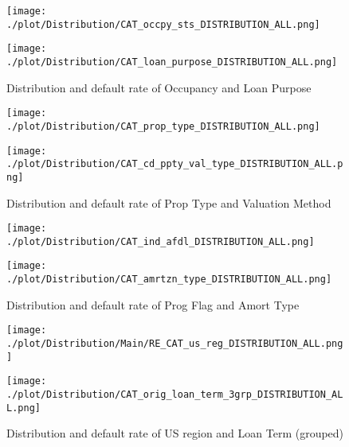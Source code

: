 \begin{figure}[H]
\begin{minipage}{.5\textwidth}
	\centering
	\texttt{[image: ./plot/Distribution/CAT\_occpy\_sts\_DISTRIBUTION\_ALL.png]}
\end{minipage}%
\begin{minipage}{.5\textwidth}
	\centering
	\texttt{[image: ./plot/Distribution/CAT\_loan\_purpose\_DISTRIBUTION\_ALL.png]}
\end{minipage}
    \caption{Distribution and default rate of Occupancy and Loan Purpose}
\end{figure}

\begin{figure}[H]
\begin{minipage}{.5\textwidth}
	\centering
	\texttt{[image: ./plot/Distribution/CAT\_prop\_type\_DISTRIBUTION\_ALL.png]}
\end{minipage}%
\begin{minipage}{.5\textwidth}
	\centering
	\texttt{[image: ./plot/Distribution/CAT\_cd\_ppty\_val\_type\_DISTRIBUTION\_ALL.png]}
\end{minipage}
    \caption{Distribution and default rate of Prop Type and Valuation Method}
\end{figure}

\begin{figure}[H]
\begin{minipage}{.5\textwidth}
	\centering
	\texttt{[image: ./plot/Distribution/CAT\_ind\_afdl\_DISTRIBUTION\_ALL.png]}
\end{minipage}%
\begin{minipage}{.5\textwidth}
	\centering
	\texttt{[image: ./plot/Distribution/CAT\_amrtzn\_type\_DISTRIBUTION\_ALL.png]}
\end{minipage}
    \caption{Distribution and default rate of Prog Flag and Amort Type}
\end{figure}

\begin{figure}[H]
\begin{minipage}{.5\textwidth}
	\centering
	\texttt{[image: ./plot/Distribution/Main/RE\_CAT\_us\_reg\_DISTRIBUTION\_ALL.png]}
\end{minipage}%
\begin{minipage}{.5\textwidth}
	\centering
	\texttt{[image: ./plot/Distribution/CAT\_orig\_loan\_term\_3grp\_DISTRIBUTION\_ALL.png]}
\end{minipage}
    \caption{Distribution and default rate of US region and Loan Term (grouped)}
\end{figure}

